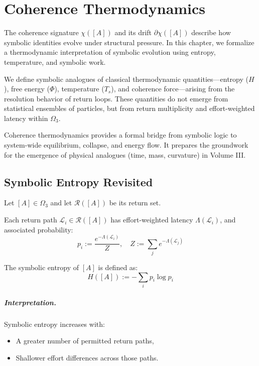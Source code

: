 \chapter{Coherence Thermodynamics} \label{chapter-5-coherence-thermodynamics}

The coherence signature $\chi([A])$ and its drift $\partial\chi([A])$ describe how symbolic identities evolve under structural pressure. In this chapter, we formalize a thermodynamic interpretation of symbolic evolution using entropy, temperature, and symbolic work.

\medskip

We define symbolic analogues of classical thermodynamic quantities—entropy ($H$), free energy ($\Phi$), temperature ($T_s$), and coherence force—arising from the resolution behavior of return loops. These quantities do not emerge from statistical ensembles of particles, but from return multiplicity and effort-weighted latency within $\Omega_3$.

\medskip

Coherence thermodynamics provides a formal bridge from symbolic logic to system-wide equilibrium, collapse, and energy flow. It prepares the groundwork for the emergence of physical analogues (time, mass, curvature) in Volume III.

\section{Symbolic Entropy Revisited} \label{symbolic-entropy-revisited}

Let $[A] \in \Omega_3$ and let $\mathcal{R}([A])$ be its return set.

Each return path $\mathcal{L}_i \in \mathcal{R}([A])$ has effort-weighted latency $\Lambda(\mathcal{L}_i)$, and associated probability:
\begin{equation} \label{eq:return-probability-entropy}
p_i := \frac{e^{-\Lambda(\mathcal{L}_i)}}{Z}, \quad
Z := \sum_j e^{-\Lambda(\mathcal{L}_j)}
\end{equation}

The symbolic entropy of $[A]$ is defined as:
\begin{equation} \label{eq:symbolic-entropy}
H([A]) := -\sum_i p_i \log p_i
\end{equation}

\paragraph{Interpretation.}
Symbolic entropy increases with:
\begin{itemize}
    \item A greater number of permitted return paths,
    \item Shallower effort differences across those paths.
\end{itemize}


